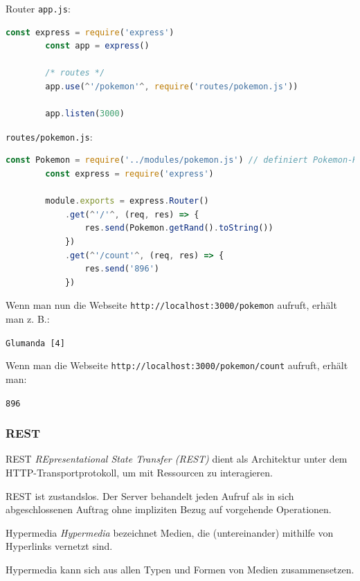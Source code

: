 \begin{example}{Router}
    \texttt{app.js}:
    \begin{lstlisting}[language=JavaScript]
        const express = require('express')
        const app = express()

        /* routes */
        app.use(^'/pokemon'^, require('routes/pokemon.js'))

        app.listen(3000)
    \end{lstlisting}

    \texttt{routes/pokemon.js}:
    \begin{lstlisting}[language=JavaScript]
        const Pokemon = require('../modules/pokemon.js') // definiert Pokemon-Klasse
        const express = require('express')
        
        module.exports = express.Router()
            .get(^'/'^, (req, res) => {
                res.send(Pokemon.getRand().toString())
            })
            .get(^'/count'^, (req, res) => {
                res.send('896')
            })
    \end{lstlisting}

    Wenn man nun die Webseite \texttt{http://localhost:3000/pokemon} aufruft, erhält man z. B.:

    \begin{center}
        \texttt{Glumanda [4]}
    \end{center}

    Wenn man die Webseite \texttt{http://localhost:3000/pokemon/count} aufruft, erhält man:

    \begin{center}
        \texttt{896}
    \end{center}
\end{example}

\subsubsection{REST}

\begin{defi}{REST}
    \emph{REpresentational State Transfer (REST)} dient als Architektur unter dem HTTP-Transportprotokoll, um mit Ressourcen zu interagieren.

    REST ist zustandslos.
    Der Server behandelt jeden Aufruf als in sich abgeschlossenen Auftrag ohne impliziten Bezug auf vorgehende Operationen.
\end{defi}

\begin{defi}{Hypermedia}
    \emph{Hypermedia} bezeichnet Medien, die (untereinander) mithilfe von Hyperlinks vernetzt sind.

    Hypermedia kann sich aus allen Typen und Formen von Medien zusammensetzen.
\end{defi}

